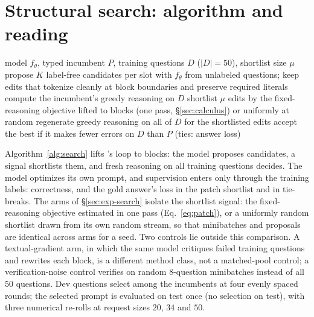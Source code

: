 \section{Structural search: algorithm and reading}
\label{app:search}

\begin{algorithm}[h]
\caption{Structural shortlist-then-verify search (one round); patch-v50 and random-v50 differ only
in line 3}
\label{alg:search}
\begin{algorithmic}[1]
\Require model $f_\theta$, typed incumbent $P$, training questions $D$ ($|D|=50$), shortlist size $\mu$
\State propose $K$ label-free candidates per slot with $f_\theta$ from unlabeled questions; keep edits
that tokenize cleanly at block boundaries and preserve required literals
\State compute the incumbent's greedy reasoning on $D$
\State shortlist $\mu$ edits by the fixed-reasoning objective lifted to blocks (one pass,
\S\ref{sec:calculus}) or uniformly at random
\State regenerate greedy reasoning on all of $D$ for the shortlisted edits
\State accept the best if it makes fewer errors on $D$ than $P$ (ties: answer loss)
\end{algorithmic}
\end{algorithm}

Algorithm~\ref{alg:search} lifts \greater{}'s loop to blocks: the model proposes candidates, a
signal shortlists them, and fresh reasoning on all training questions decides. The model optimizes
its own prompt, and supervision enters only through the training labels: correctness, and the gold
answer's loss in the patch shortlist and in tie-breaks. The arms of
\S\ref{sec:exp-search} isolate the shortlist signal: the fixed-reasoning objective estimated in one
pass (Eq.~\ref{eq:patch}), or a uniformly random shortlist drawn from its own random stream, so
that minibatches and proposals are identical across arms for a seed. Two controls lie outside this
comparison. A textual-gradient arm, in which the same model critiques failed training questions and
rewrites each block, is a different method class, not a matched-pool control; a verification-noise
control verifies on random $8$-question minibatches instead of all $50$ questions. Dev questions
select among the incumbents at four evenly spaced rounds; the selected prompt is evaluated on test
once (no selection on test), with three numerical re-rolls at request sizes $20$, $34$ and $50$.

